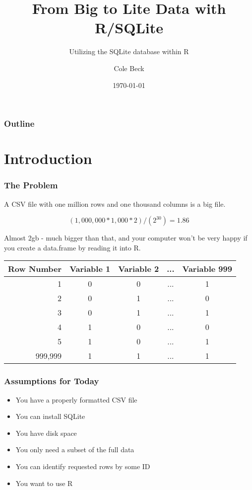 \documentclass{beamer}
\title{From Big to Lite Data with R/SQLite}
\subtitle{Utilizing the SQLite database within R}
\author{Cole Beck}
\institute{Dept of Biostatistics}
\date{\today}
\begin{document}
\begin{frame}
\titlepage
\end{frame}

\begin{frame}
\frametitle{Outline}
\tableofcontents
\end{frame}

\section{Introduction}

\begin{frame}
\frametitle{The Problem}
    A CSV file with one million rows and one thousand columns is a big file.

    $$(1,000,000 * 1,000 * 2) / (2^{30}) = 1.86$$

    Almost 2gb - much bigger than that, and your computer won't be very happy if you create a data.frame by reading it into R.

    \begin{table}
    \begin{tabular}{r|c|c|c|c}
    Row Number & Variable 1 & Variable 2 & ... & Variable 999 \\
    \hline
    1 & 0 & 0 & ... & 1 \\
    2 & 0 & 1 & ... & 0 \\
    3 & 0 & 1 & ... & 1 \\
    4 & 1 & 0 & ... & 0 \\
    5 & 1 & 0 & ... & 1 \\
    \hline
    \hline
    999,999 & 1 & 1 & ... & 1 \\
    \end{tabular}
    \end{table}
\end{frame}

\begin{frame}
\frametitle{Assumptions for Today}
    \begin{itemize}
    \item You have a properly formatted CSV file
    \item You can install SQLite
    \item You have disk space
    \item You only need a subset of the full data
    \item You can identify requested rows by some ID
    \item You want to use R
    \end{itemize}
\end{frame}
\end{document}
